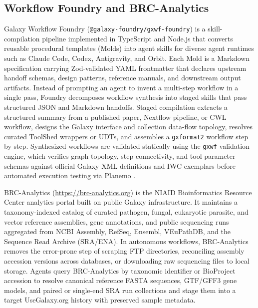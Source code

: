 \documentclass[11pt,letterpaper]{article}
\newcommand{\tool}[1]{\textsf{#1}}
\begin{document}
\subsection*{\tool{Workflow Foundry} and \tool{BRC-Analytics}}
Galaxy \tool{Workflow Foundry} (\texttt{@galaxy-foundry/gxwf-foundry}) \cite{foundry2026} is a skill-compilation pipeline implemented in TypeScript and Node.js that converts reusable procedural templates (Molds) into agent skills for diverse agent runtimes such as Claude Code, Codex, Antigravity, and \tool{Orbit}. Each Mold is a Markdown specification carrying Zod-validated YAML frontmatter that declares upstream handoff schemas, design patterns, reference manuals, and downstream output artifacts. Instead of prompting an agent to invent a multi-step workflow in a single pass, Foundry decomposes workflow synthesis into staged skills that pass structured JSON and Markdown handoffs. Staged compilation extracts a structured summary from a published paper, \tool{Nextflow} pipeline, or CWL workflow, designs the Galaxy interface and collection data-flow topology, resolves curated ToolShed wrappers or UDTs, and assembles a \texttt{gxformat2} workflow step by step. Synthesized workflows are validated statically using the \texttt{gxwf} validation engine, which verifies graph topology, step connectivity, and tool parameter schemas against official Galaxy XML definitions and IWC exemplars \cite{iwc2026} before automated execution testing via \tool{Planemo} \cite{bray2023planemo}.

\tool{BRC-Analytics} (\url{https://brc-analytics.org}) \cite{brcanalytics2026} is the NIAID Bioinformatics Resource Center analytics portal built on public Galaxy infrastructure. It maintains a taxonomy-indexed catalog of curated pathogen, fungal, eukaryotic parasite, and vector reference assemblies, gene annotations, and public sequencing runs aggregated from NCBI Assembly, RefSeq, Ensembl, VEuPathDB, and the Sequence Read Archive (SRA/ENA). In autonomous workflows, \tool{BRC-Analytics} removes the error-prone step of scraping FTP directories, reconciling assembly accession versions across databases, or downloading raw sequencing files to local storage. Agents query \tool{BRC-Analytics} by taxonomic identifier or BioProject accession to resolve canonical reference FASTA sequences, GTF/GFF3 gene models, and paired or single-end SRA run collections and stage them into a target UseGalaxy.org history with preserved sample metadata.
\end{document}
